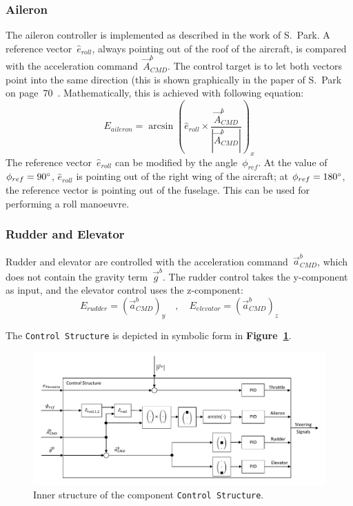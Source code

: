 \documentclass[11pt,a4paper]{scrartcl}		%
\begin{document}
\subsubsection*{Aileron}
The aileron controller is implemented as described in the work of S.~Park\cite[p.~71]{Park.2012}.
A reference vector~$\hat{e}_{roll}$, always pointing out of the roof of the aircraft, is compared with the acceleration command~$\vec{A}_{CMD}^b$. 
The control target is to let both vectors point into the same direction (this is shown graphically in the paper of S.~Park on page~70~\cite{Park.2012}.
Mathematically, this is achieved with following equation:
\begin{equation}
E_{aileron}=\arcsin\left(\hat{e}_{roll} \times \frac{\vec{A}_{CMD}^b}{|\vec{A}_{CMD}^b|}\right)_x
\end{equation}
The reference vector~$\hat{e}_{roll}$ can be modified by the angle~$\phi_{ref}$. At the value of $\phi_{ref}=90\degree$, $\hat{e}_{roll}$ is pointing out of the right wing of the aircraft; at $\phi_{ref}=180\degree$, the reference vector is pointing out of the fuselage.
This can be used for performing a roll manoeuvre.

\subsubsection*{Rudder and Elevator}
Rudder and elevator are controlled with the acceleration command~$\vec{a}_{CMD}^b$, which does not contain the gravity term~$\vec{g}^b$.
The rudder control takes the y-component as input, and the elevator control uses the z-component:
\begin{equation}
E_{rudder}=(\vec{a}_{CMD}^b)_y\quad , \quad E_{elevator} = (\vec{a}_{CMD}^b)_z
\end{equation}

The \texttt{Control Structure} is depicted in symbolic form in \textbf{Figure~\ref{fig_Control-Structure}}.

\begin{figure}[tbh]
  \begin{center}
  	\includegraphics[width=12cm]{pictures/PID.pdf}
  \end{center}
  \caption{Inner structure of the component \texttt{Control Structure}.}
  \label{fig_Control-Structure}
\end{figure}
\end{document}
